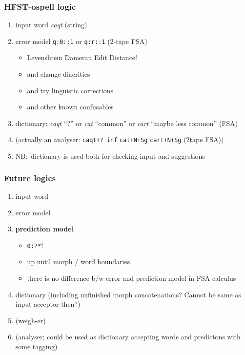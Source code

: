 \documentclass{beamer}
\begin{document}
\begin{frame}
    \frametitle{HFST-ospell logic}
    \begin{enumerate}
        \item input word \textit{caqt} (string)
        \item error model \texttt{q:0::1} or \texttt{q:r::1} (2-tape
            FSA)\begin{itemize}
                \item Levenshtein Damerau Edit Distance!
                \item and change diacritics
                \item and try linguistic corrections
                \item and other known confusables
            \end{itemize}
        \item dictionary: \textit{caqt} ``?'' or \textit{cat} ``common'' or
            \textit{cart} ``maybe less common'' (FSA)
        \item (actually an analyser: \texttt{caqt+? inf} \texttt{cat+N+Sg}
            \texttt{cart+N+Sg} (2tape FSA))
        \item NB:\ dictionary is used both for checking input and suggestions
    \end{enumerate}
\end{frame}

\begin{frame}
    \frametitle{Future logics}
    \begin{enumerate}
        \item input word
        \item error model
        \item \textbf{prediction model} \begin{itemize}
                \item \texttt{0:?*}!
                \item up until morph / word boundaries
                \item there is no difference b/w error and prediction model in
                    FSA calculus
        \end{itemize}
        \item dictionary (including unfinished morph concatenations? Cannot be
            same as input acceptor then?)
        \item (weigh-er)
        \item (analyser; could be used as dictionary accepting words and
            predictons with some tagging)
    \end{enumerate}
\end{frame}
\end{document}
